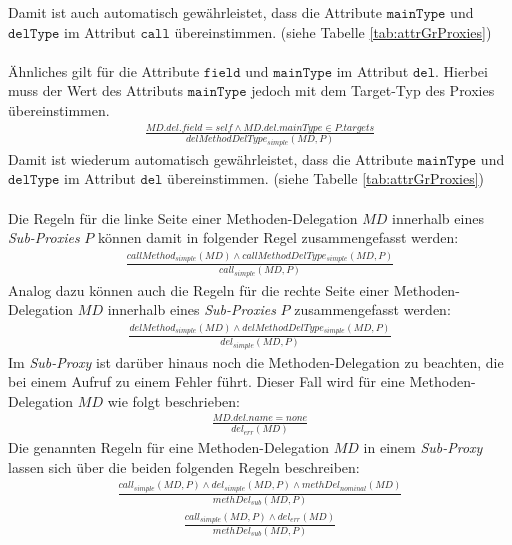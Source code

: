 Damit ist auch automatisch gewährleistet, dass die Attribute $\texttt{mainType}$ und $\texttt{delType}$ im Attribut $\texttt{call}$ übereinstimmen. (siehe Tabelle \ref{tab:attrGrProxies})\\\\
Ähnliches gilt für die Attribute $\texttt{field}$ und $\texttt{mainType}$ im Attribut $\texttt{del}$. Hierbei muss der Wert des Attributs $\texttt{mainType}$ jedoch mit dem Target-Typ des Proxies übereinstimmen.
\begin{gather*}
\frac{\mathit{MD.del.field} = \mathit{self} \wedge  \mathit{MD.del.mainType} \in \mathit{P.targets} }
{\mathit{delMethodDelType_{simple}(MD, P)}}
\end{gather*}
Damit ist wiederum automatisch gewährleistet, dass die Attribute $\texttt{mainType}$ und $\texttt{delType}$ im Attribut $\texttt{del}$ übereinstimmen. (siehe Tabelle \ref{tab:attrGrProxies})\\\\
Die Regeln für die linke Seite einer Methoden-Delegation $\mathit{MD}$ innerhalb eines \emph{Sub-Proxies} $P$ können damit in folgender Regel zusammengefasst werden:
\begin{gather*}
\frac{\mathit{callMethod_{simple}(MD)} \wedge \mathit{callMethodDelType_{simple}(MD,P)}}
{\mathit{call_{simple}(MD,P)}}
\end{gather*}
Analog dazu können auch die Regeln für die rechte Seite einer Methoden-Delegation $\mathit{MD}$ innerhalb eines \emph{Sub-Proxies} $P$ zusammengefasst werden:
\begin{gather*}
\frac{\mathit{delMethod_{simple}(MD)} \wedge \mathit{delMethodDelType_{simple}(MD,P)}}
{\mathit{del_{simple}(MD,P)}}
\end{gather*}
Im \emph{Sub-Proxy} ist darüber hinaus noch die Methoden-Delegation zu beachten, die bei einem Aufruf zu einem Fehler führt. Dieser Fall wird für eine Methoden-Delegation $\mathit{MD}$ wie folgt beschrieben:
\begin{gather*}
\frac{\mathit{MD.del.name} = \mathit{none}}
{\mathit{del_{err}(MD)}}
\end{gather*}
Die genannten Regeln für eine Methoden-Delegation $\mathit{MD}$ in einem \emph{Sub-Proxy} lassen sich über die beiden folgenden Regeln beschreiben:
\begin{gather*}
\frac{\mathit{call_{simple}(MD,P)} \wedge \mathit{del_{simple}(MD,P) \wedge \mathit{methDel_{nominal}(MD)}}}
{\mathit{methDel_{sub}(MD,P)}}
\end{gather*}
\begin{gather*}
\frac{\mathit{call_{simple}(MD,P)}\wedge\mathit{del_{err}(MD)}
}
{\mathit{methDel_{sub}(MD,P)}}
\end{gather*}
